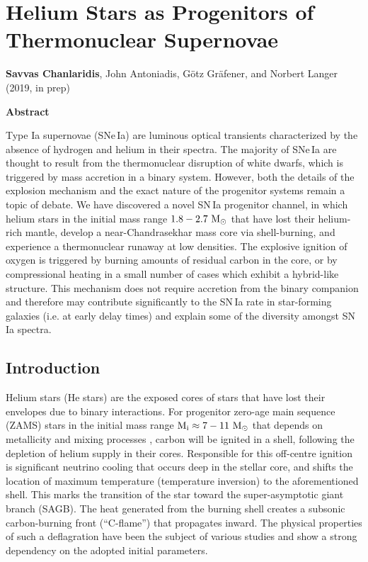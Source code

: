 \documentclass[../../main/thesis_msc.tex]{subfiles}
\begin{document}
\chapter{Helium Stars as Progenitors of Thermonuclear Supernovae}

\begin{center}
\textbf{Savvas Chanlaridis}, John Antoniadis, G\"otz Gr\"afener, and Norbert Langer (2019, in prep)
\newline
\end{center}


\begin{center}
\textbf{\large Abstract}
\end{center}
		
Type Ia supernovae (SNe\,Ia) are luminous optical transients characterized by the absence of hydrogen and helium in their spectra. 
The majority of SNe\,Ia are thought to result from the thermonuclear disruption of white dwarfs, which is triggered by mass accretion in a binary system. 
However, both the details of the explosion mechanism and the exact nature of the progenitor systems remain a topic of debate. 
We have discovered a novel SN\,Ia progenitor channel, in which helium stars in the initial mass range $1.8-2.7 \rm \ M_{\odot}$ that have lost their helium-rich mantle, develop a near-Chandrasekhar mass core via shell-burning, and experience a thermonuclear runaway at low densities. The explosive ignition of oxygen is triggered by burning amounts of residual carbon in the core, or by compressional heating in a small number of cases which exhibit a hybrid-like structure. This mechanism does not require accretion from the binary companion and therefore may contribute significantly to the SN\,Ia rate in star-forming galaxies (i.e. at early delay times) and explain some of the diversity amongst SN\,Ia spectra.

{\hypersetup{linkcolor=black, pdfborder=0 0 1}
	\minitoc
	\newpage
	}
\section{Introduction} \label{sec:introduction}
Helium stars (He stars) are the exposed cores of stars that have lost their envelopes due to binary interactions. For progenitor zero-age main sequence (ZAMS) stars in the initial mass range $\rm M_i \approx  7 - 11 \ M_{\odot}$ that depends on metallicity and mixing processes 
\citep[e.g.][]{Ritossa1996, Ritossa1999, GilPons2005, siess2006, Poelarends2008, Farmer:2015afs}, carbon will be ignited in a shell, following the depletion of helium supply in their cores. Responsible for this off-centre ignition is significant neutrino cooling that occurs deep in the stellar core, and shifts the location of maximum temperature (temperature inversion) to the aforementioned shell. This marks the transition of the star toward the super-asymptotic giant branch (SAGB). The heat generated from the burning shell creates a subsonic carbon-burning front (``C-flame'') that propagates inward. The physical properties of such a deflagration have been the subject of various studies \citep[e.g.][]{Timmes_1994, siess2006, Siess2009, Denissenkov:2013qaa, Farmer:2015afs} and show a strong dependency on the adopted initial parameters.
\end{document}
